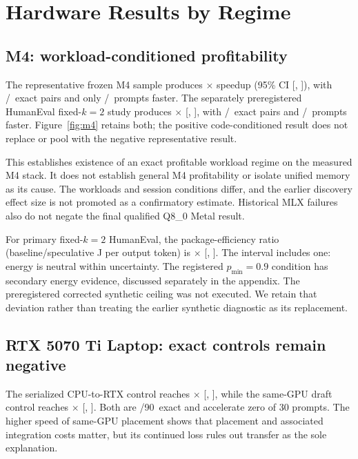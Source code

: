 \section{Hardware Results by Regime}
\label{sec:results}

\subsection{M4: workload-conditioned profitability}

The representative frozen M4 sample produces \MRepSpeed$\times$ speedup (95\% CI [\MRepLo, \MRepHi]), with \MRepExact/\MRepPairs\ exact pairs and only \MRepFaster/\MRepN\ prompts faster. The separately preregistered HumanEval fixed-$k=2$ study produces \MHEspeed$\times$ [\MHElo, \MHEhi], with \MHEexact/\MHEpairs\ exact pairs and \MHEfaster/\MHEprompts\ prompts faster. Figure~\ref{fig:m4} retains both; the positive code-conditioned result does not replace or pool with the negative representative result.

This establishes existence of an exact profitable workload regime on the measured M4 stack. It does not establish general M4 profitability or isolate unified memory as its cause. The workloads and session conditions differ, and the earlier discovery effect size is not promoted as a confirmatory estimate. Historical MLX failures also do not negate the final qualified Q8\_0 Metal result.

For primary fixed-$k=2$ HumanEval, the package-efficiency ratio (baseline/speculative J per output token) is \MHEenergy$\times$ [\MHEenergyLo, \MHEenergyHi]. The interval includes one: energy is neutral within uncertainty. The registered $p_{\min}=0.9$ condition has secondary energy evidence, discussed separately in the appendix. The preregistered corrected synthetic ceiling was not executed. We retain that deviation rather than treating the earlier synthetic diagnostic as its replacement.

\subsection{RTX 5070 Ti Laptop: exact controls remain negative}
The serialized CPU-to-RTX control reaches \RTXcpuSpeed$\times$ [\RTXcpuLo, \RTXcpuHi], while the same-GPU draft control reaches \RTXgpuSpeed$\times$ [\RTXgpuLo, \RTXgpuHi]. Both are \RTXexact/90\ exact and accelerate zero of 30 prompts. The higher speed of same-GPU placement shows that placement and associated integration costs matter, but its continued loss rules out transfer as the sole explanation.

